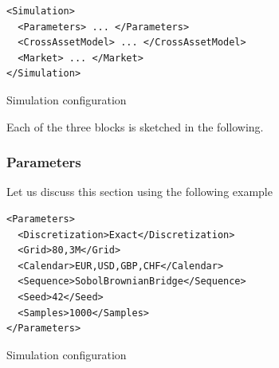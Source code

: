 \documentclass[12pt, a4paper]{article}
\begin{document}
\begin{listing}[H]
\begin{verbatim}
<Simulation>
  <Parameters> ... </Parameters>
  <CrossAssetModel> ... </CrossAssetModel>
  <Market> ... </Market>
</Simulation>
\end{verbatim}
\caption{Simulation configuration}
\label{lst:simulation_configuration}
\end{listing}

Each of the three blocks is sketched in the following.

\subsubsection{Parameters}\label{sec:sim_params}

Let us discuss this section using the following example

\begin{listing}[H]
\begin{verbatim}
<Parameters>
  <Discretization>Exact</Discretization>
  <Grid>80,3M</Grid>
  <Calendar>EUR,USD,GBP,CHF</Calendar>
  <Sequence>SobolBrownianBridge</Sequence>
  <Seed>42</Seed>
  <Samples>1000</Samples>
</Parameters>
\end{verbatim}
\caption{Simulation configuration}
\label{lst:simulation_params_configuration}
\end{listing}
\end{document}
